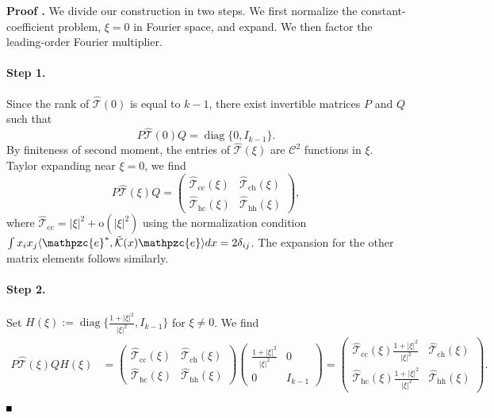 \documentclass[10pt]{article}
\newenvironment{Proof}[1][\unskip]%
 {\begin{trivlist} \item[]{\bf Proof #1. }}%
 {\hspace*{\fill}$\rule{.4\baselineskip}{.4\baselineskip}$\end{trivlist}}
\newcommand{\rmo}{\mathrm{o}}
\newcommand{\K}{\mathcal{K}}
\newcommand{\That}{\widehat{\mathcal{T}}}
\newcommand{\e}{\mathpzc{e}}
\newcommand{\diag}{\operatorname{diag}}
\begin{document}
\begin{Proof}
We divide our construction in two steps. We first normalize the constant-coefficient problem, $\xi=0$ in Fourier space, and expand. We then factor the leading-order Fourier multiplier. 
 
 

\paragraph{Step 1.}

Since the rank of $\widehat{\mathcal{T}}(0)$ is equal to $k-1$, there exist invertible matrices $P$ and $Q$ such that
\[
P\That(0)Q = \diag\{0,I_{k-1}\}.
\]
By finiteness of second moment, the entries of $\That(\xi)$ are $\mathscr{C}^2$ functions in $\xi$. Taylor expanding near $\xi = 0$, we find 
\[
P\That(\xi)Q = \begin{pmatrix}
\That_\mathrm{cc}(\xi)& \That_\mathrm{ch}(\xi)\\
\That_\mathrm{hc}(\xi)& \That_\mathrm{hh}(\xi) 
\end{pmatrix},
\]
where $\That_\mathrm{cc} = |\xi|^2+\rmo(|\xi|^2)$ using the normalization condition $\int x_ix_j\langle {\e}^*, \tilde{\K}(x){\e}\rangle dx = 2\delta_{ij}$. The expansion for the other matrix elements follows similarly. 



\paragraph{Step 2.} Set $
H(\xi) := \diag\{\frac{1+|\xi|^2}{|\xi|^2}, I_{k-1}\}$ for $\xi \neq 0$. 
We find
\begin{align*}
P\That(\xi)QH(\xi) &= \begin{pmatrix}
\That_\mathrm{cc}(\xi)& \That_\mathrm{ch}(\xi)\\
\That_\mathrm{hc}(\xi)& \That_\mathrm{hh}(\xi) 
\end{pmatrix} \begin{pmatrix}
\frac{1+|\xi|^2}{{|\xi|^2}}&0 \\
0& I_{k-1} 
\end{pmatrix}
= \begin{pmatrix}
\That_\mathrm{cc}(\xi)\frac{1+|\xi|^2}{|\xi|^2} & \That_\mathrm{ch}(\xi)\\
\That_\mathrm{hc}(\xi)\frac{1+|\xi|^2}{|\xi|^2} & \That_\mathrm{hh}(\xi)
\end{pmatrix}.
\end{align*}


\end{Proof}
\end{document}
